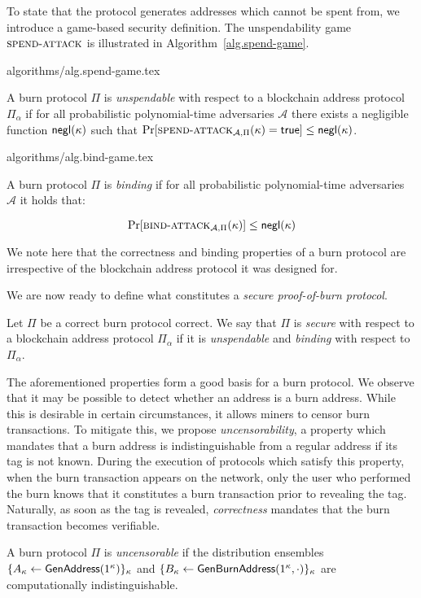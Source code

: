 To state that the protocol generates addresses which cannot be spent from, we introduce a game-based security definition. The unspendability game $\textsc{spend}\-\text{-}\-\textsc{attack}$ is illustrated in Algorithm~\ref{alg.spend-game}.

{algorithms/alg.spend-game.tex}

\begin{definition}[Unspendability]
  A burn protocol $\Pi$ is \emph{unspendable} with respect to a blockchain address protocol $\Pi_\alpha$ if
  for all probabilistic polynomial-time adversaries $\mathcal{A}$ there exists a negligible function $\textsf{negl}(\kappa)$ such that
  $
    \Pr[\textsc{spend}\-\text{-}\-\textsc{attack}_{\mathcal{A}, \Pi}(\kappa) = \textsf{true}] \leq \textsf{negl}(\kappa)
  $.
\end{definition}

{algorithms/alg.bind-game.tex}

\begin{definition}[Binding]
  A burn protocol $\Pi$ is \emph{binding} if
  for all probabilistic polynomial-time adversaries $\mathcal{A}$ it holds that:

  \[
    \Pr[\textsc{bind}\-\text{-}\-\textsc{attack}_{\mathcal{A},\Pi}(\kappa)] \leq \textsf{negl}(\kappa)
  \]
\end{definition}

We note here that the correctness and binding properties of a burn protocol are irrespective of the blockchain address protocol it was designed for.

We are now ready to define what constitutes a \emph{secure proof-of-burn protocol}.

\begin{definition}[Security]
  Let $\Pi$ be a correct burn protocol correct. We say that $\Pi$ is \emph{secure} with respect to a blockchain address protocol $\Pi_\alpha$ if it is \emph{unspendable} and \emph{binding} with respect to $\Pi_\alpha$.
\end{definition}

The aforementioned properties form a good basis for a burn protocol. We observe that it may be possible to detect whether an address is a burn address. While this is desirable in certain circumstances, it allows miners to censor burn transactions. To mitigate this, we propose \emph{uncensorability}, a property which mandates that a burn address is indistinguishable from a regular address if its tag is not known. During the execution of protocols which satisfy this property, when the burn transaction appears on the network, only the user who performed the burn knows that it constitutes a burn transaction prior to revealing the tag. Naturally, as soon as the tag is revealed, \emph{correctness} mandates that the burn transaction becomes verifiable.

\begin{definition}[Uncensorability]
  A burn protocol $\Pi$ is \emph{uncensorable} if
  the distribution ensembles $\{A_\kappa \gets \mathsf{GenAddress}(1^\kappa)\}_\kappa$ and
  $\{B_\kappa \gets \mathsf{Gen}\-\mathsf{Burn}\-\mathsf{Address}(1^\kappa, \cdot)\}_\kappa$ are computationally indistinguishable.
\end{definition}
